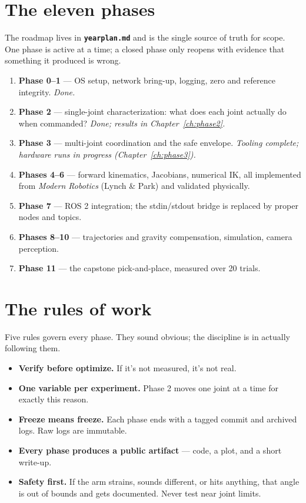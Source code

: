 \documentclass[11pt,twoside,openright]{book}
\newcommand{\code}[1]{\texttt{\bfseries #1}}
\begin{document}
\section{The eleven phases}

The roadmap lives in \code{yearplan.md} and is the single source of truth
for scope. One phase is active at a time; a closed phase only reopens with
evidence that something it produced is wrong.

\begin{enumerate}
  \item \textbf{Phase 0--1} --- OS setup, network bring-up, logging, zero
    and reference integrity. \emph{Done.}
  \item \textbf{Phase 2} --- single-joint characterization: what does each
    joint actually do when commanded? \emph{Done; results in Chapter~\ref{ch:phase2}.}
  \item \textbf{Phase 3} --- multi-joint coordination and the safe
    envelope. \emph{Tooling complete; hardware runs in progress
    (Chapter~\ref{ch:phase3}).}
  \item \textbf{Phases 4--6} --- forward kinematics, Jacobians,
    numerical IK, all implemented from \textit{Modern Robotics} (Lynch \&
    Park) and validated physically.
  \item \textbf{Phase 7} --- ROS 2 integration; the stdin/stdout bridge is
    replaced by proper nodes and topics.
  \item \textbf{Phases 8--10} --- trajectories and gravity compensation,
    simulation, camera perception.
  \item \textbf{Phase 11} --- the capstone pick-and-place, measured over
    20 trials.
\end{enumerate}

\section{The rules of work}

Five rules govern every phase. They sound obvious; the discipline is in
actually following them.

\begin{itemize}
  \item \textbf{Verify before optimize.} If it's not measured, it's not
    real.
  \item \textbf{One variable per experiment.} Phase 2 moves one joint at a
    time for exactly this reason.
  \item \textbf{Freeze means freeze.} Each phase ends with a tagged commit
    and archived logs. Raw logs are immutable.
  \item \textbf{Every phase produces a public artifact} --- code, a plot,
    and a short write-up.
  \item \textbf{Safety first.} If the arm strains, sounds different, or
    hits anything, that angle is out of bounds and gets documented. Never
    test near joint limits.
\end{itemize}
\end{document}
